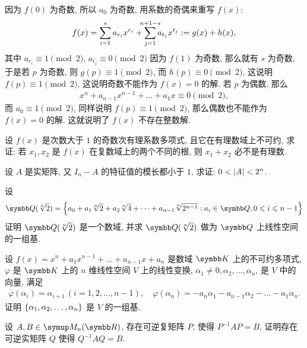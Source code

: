 \begin{exercise}[series=exer]
\begin{answer}
      因为 $ f(0) $ 为奇数, 所以 $ a_{0} $ 为奇数, 用系数的奇偶来重写 $ f(x) $:
      \begin{align*}
          f(x) = \sum_{i = 1}^{s}a_{r_{i}}x^{r_{i}} + \sum_{j = 1}^{\mathclap{n + 1 - s}}a_{t_{j}}x^{t_{j}} := g(x) + h(x),
      \end{align*}
      其中 $ a_{r_{i}} \equiv 1 \pmod{2} $, $ a_{t_{j}} \equiv 0 \pmod{2} $ 因为 $ f(1) $ 为奇数, 那么就有 $ s $ 为奇数, 于是若 $ p $ 为奇数, 则 $ g(p) \equiv 1 \pmod{2} $, 而 $ h(p) \equiv 0 \pmod{2} $, 这说明 $ f(p) \equiv 1 \pmod{2} $, 这说明奇数不能作为 $ f(x) = 0 $ 的解. 若 $ p $ 为偶数, 那么
      \begin{align*}
          x^{n} + a_{n - 1}x^{n - 1} + \dots + a_{1}x \equiv 0 \pmod{2},
      \end{align*}
      而 $ a_{0} \equiv 1 \pmod{2} $, 同样说明 $ f(p) \equiv 1 \pmod{2} $, 那么偶数也不能作为 $ f(x) = 0 $ 的解. 这就说明了 $ f(x) $ 不存在整数解.
  \end{answer}
  \item 设 $ f(x) $ 是次数大于 $ 1 $ 的奇数次有理系数多项式, 且它在有理数域上不可约, 求证: 若 $ x_{1}, x_{2} $ 是 $ f(x) $ 在复数域上的两个不同的根, 则 $ x_{1} + x_{2} $ 必不是有理数.
  \item 设 $ A $ 是实矩阵, 又 $ I_{n} - A $ 的特征值的模长都小于 $ 1 $, 求证: $ 0<\abs{A}<2^{n} $.
  \item 设
  \begin{align*}
      \Q(\sqrt[n]{2}) = \set{a_{0} + a_{1}\sqrt[n]{2} + a_{2}\sqrt[n]{4} + \dots + a_{n-1}\sqrt[n]{2^{n-1}} : a_{i} \in \Q, 0\le i\le n-1}
  \end{align*}
  证明 $ \Q(\sqrt[n]{2}) $ 是一个数域, 并求 $ \Q(\sqrt[n]{2}) $ 做为 $ \Q $ 上线性空间的一组基.
  \item 设 $ f(x) = x^{n} + a_{1}x^{n-1} + \dots + a_{n-1}x + a_{n} $ 是数域 $ \K $ 上的不可约多项式, $ \varphi $ 是 $ \K $ 上的 $ n $ 维线性空间 $ V $ 上的线性变换, $ \alpha_{1} \ne 0, \alpha_{2}, \dots, \alpha_{n} $, 是 $ V $ 中的向量, 满足
  \begin{align*}
      \varphi(\alpha_{i}) = \alpha_{i + 1}\,(i = 1, 2, \dots, n-1), \quad \varphi(\alpha_{n}) = -a_{n}\alpha_{1} - a_{n-1}\alpha_{2} - \dots - a_{1}\alpha_{n}.
  \end{align*}
  证明 $ \qty{\alpha_{1}, \alpha_{2}, \dots, \alpha_{n}} $ 是 $ V $ 的一组基.
  \item\label{item:CtoR} 设 $ A, B \in \MM $, 存在可逆复矩阵 $ P $, 使得 $ P^{-1}AP = B $, 证明存在可逆实矩阵 $ Q $ 使得 $ Q^{-1}AQ = B $.
  \begin{hint}

\end{hint}
\end{exercise}
